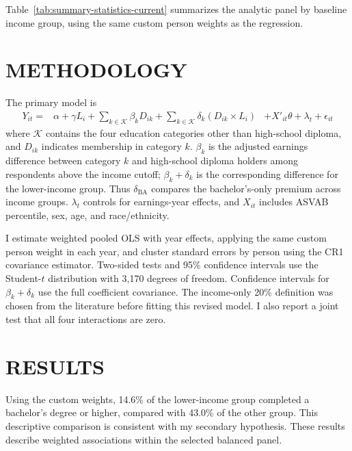 \documentclass[12pt,letterpaper]{article}
\begin{document}
Table~\ref{tab:summary-statistics-current} summarizes the analytic panel by baseline
income group, using the same custom person weights as the regression.

\FloatBarrier

\section*{METHODOLOGY}

The primary model is
\[
\begin{aligned}
    Y_{it}={}&\alpha+\gamma L_i+\sum_{k\in\mathcal K}\beta_k D_{ik}
              +\sum_{k\in\mathcal K}\delta_k(D_{ik}\times L_i)
             &+X'_{it}\theta+\lambda_t+\epsilon_{it}
\end{aligned}
\]
where $\mathcal K$ contains the four education categories other than high-school
diploma, and $D_{ik}$ indicates membership in category $k$. $\beta_k$ is the adjusted
earnings difference between category $k$ and high-school diploma holders among
respondents above the income cutoff; $\beta_k+\delta_k$ is the corresponding
difference for the lower-income group. Thus $\delta_{\mathrm{BA}}$ compares the
bachelor's-only premium across income groups. $\lambda_t$ controls for earnings-year
effects, and $X_{it}$ includes ASVAB percentile, sex, age, and race/ethnicity.\newline

I estimate weighted pooled OLS with year effects, applying the same custom person
weight in each year, and cluster standard errors by person using the CR1 covariance
estimator. Two-sided tests and 95\% confidence intervals use the Student-$t$
distribution with 3,170 degrees of freedom. Confidence intervals for
$\beta_k+\delta_k$ use the full coefficient covariance. The income-only 20\%
definition was chosen from the literature before fitting this revised model. I also 
report a joint test that all four interactions are zero. \newline

\section*{RESULTS}
Using the custom weights, 14.6\% of the lower-income group completed a bachelor's
degree or higher, compared with 43.0\% of the other group. This descriptive comparison
is consistent with my secondary hypothesis. These results describe weighted
associations within the selected balanced panel.\newline
\end{document}
